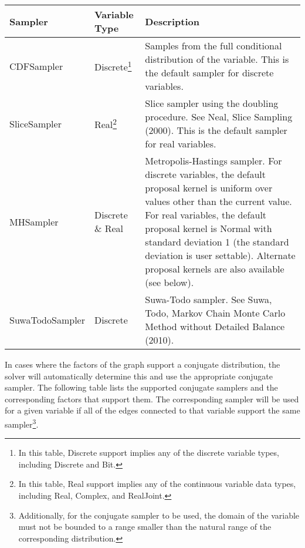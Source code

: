 \begin{longtable} {l l p{8.0cm}}
Sampler & Variable Type &  Description \\
\hline
\endhead
CDFSampler & Discrete\footnote{In this table, Discrete support implies any of the discrete variable types, including Discrete and Bit.} & Samples from the full conditional distribution of the variable.  This is the default sampler for discrete variables. \\
SliceSampler & Real\footnote{In this table, Real support implies any of the continuous variable data types, including Real, Complex, and RealJoint.} & Slice sampler using the doubling procedure.  See Neal, Slice Sampling (2000).  This is the default sampler for real variables. \\
MHSampler & Discrete \& Real & Metropolis-Hastings sampler.  For discrete variables, the default proposal kernel is uniform over values other than the current value.  For real variables, the default proposal kernel is Normal with standard deviation 1 (the standard deviation is user settable).  Alternate proposal kernels are also available (see below). \\
SuwaTodoSampler & Discrete & Suwa-Todo sampler.  See Suwa, Todo, Markov Chain Monte Carlo Method without Detailed Balance (2010). \\
\end{longtable}


In cases where the factors of the graph support a conjugate distribution, the solver will automatically determine this and use the appropriate conjugate sampler.  The following table lists the supported conjugate samplers and the corresponding factors that support them.  The corresponding sampler will be used for a given variable if all of the edges connected to that variable support the same sampler\footnote{Additionally, for the conjugate sampler to be used, the domain of the variable must not be bounded to a range smaller than the natural range of the corresponding distribution.}.

